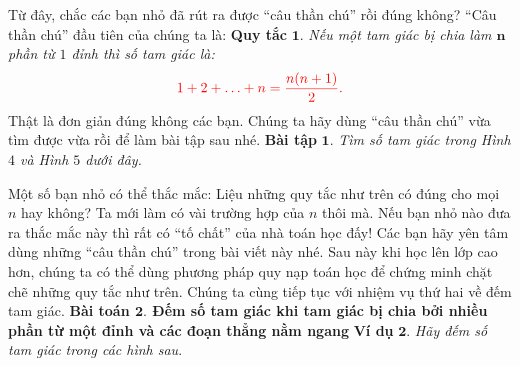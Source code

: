 	\vskip 0.1cm
	Từ đây, chắc các bạn nhỏ đã rút ra được “câu thần chú” rồi đúng không? “Câu thần chú” đầu tiên của chúng ta là:
	\vskip 0.1cm
	\textbf{\color{toancuabi}Quy tắc} $\pmb{1.}$  \textit{Nếu một tam giác bị chia làm $\pmb{n}$ phần từ $1$ đỉnh thì số tam giác là:}
	\begin{align*}
	\color{red} 1+2+\ldots+n = \frac{n(n+1)}{2}.
	\end{align*}
	Thật là đơn giản đúng không các bạn. Chúng ta hãy dùng “câu thần chú” vừa tìm được vừa rồi để làm bài tập sau nhé.
	\vskip 0.1cm
	\textbf{\color{toancuabi}Bài tập} $\pmb{1.}$ \textit{Tìm số tam giác trong Hình $4$ và Hình $5$ dưới đây.}
	\begin{figure}[H]
		\centering
		\vspace*{-5pt}
		\captionsetup{labelformat= empty, justification=centering}
		\captionsetup[subfigure]{labelformat=empty}
		\hfill
		\hfill
		\hfill
		\vspace*{-10pt}
	\end{figure}   
	Một số bạn nhỏ có thể thắc mắc: Liệu những quy tắc như trên có đúng cho mọi $n$ hay không? Ta mới làm có vài trường hợp của $n$ thôi mà. Nếu bạn nhỏ nào đưa ra thắc mắc này thì rất có “tố chất” của nhà toán học đấy! Các bạn hãy yên tâm dùng những “câu thần chú” trong bài viết này nhé. Sau này khi học lên lớp cao hơn, chúng ta có thể dùng phương pháp quy nạp toán học để chứng minh chặt chẽ những quy tắc như trên.
	\vskip 0.1cm
	Chúng ta cùng tiếp tục với nhiệm vụ thứ hai về đếm tam giác.
	\vskip 0.1cm
	\textbf{\color{toancuabi}Bài toán $\pmb{2.}$ Đếm số tam giác khi tam giác bị chia bởi nhiều phần từ một đỉnh và các đoạn thẳng nằm ngang}
	\vskip 0.1cm
	\textbf{\color{toancuabi}Ví dụ} $\pmb{2.}$ \textit{Hãy đếm số tam giác trong các hình sau}.
